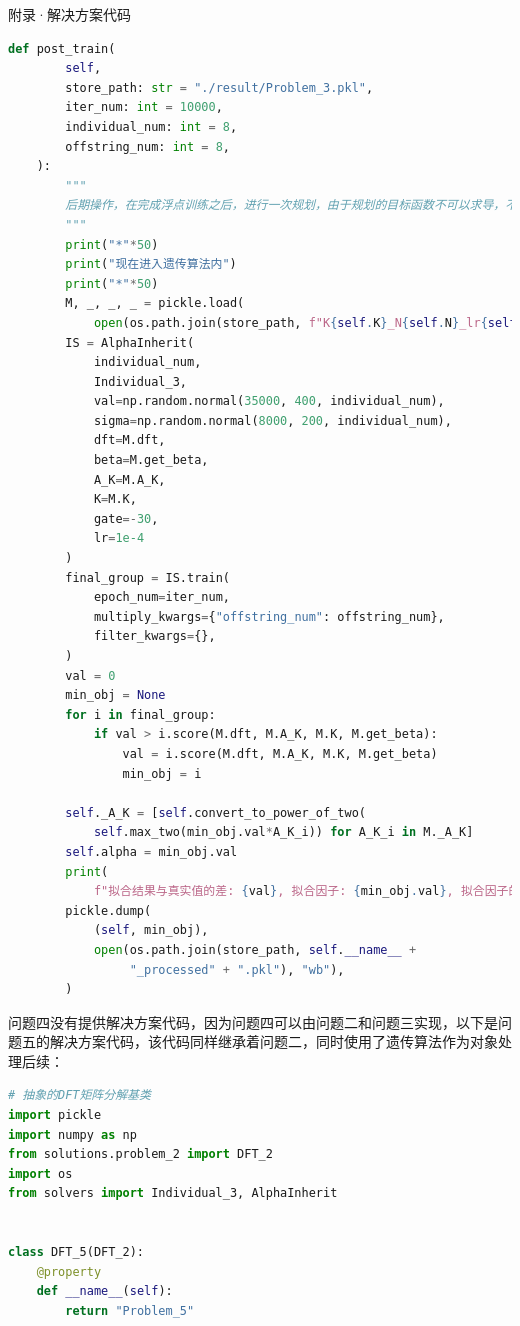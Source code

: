 \documentclass[11pt]{article}
\begin{document}
\begin{section}{附录·解决方案代码}
\begin{lstlisting}[language=Python]
    def post_train(
        self,
        store_path: str = "./result/Problem_3.pkl",
        iter_num: int = 10000,
        individual_num: int = 8,
        offstring_num: int = 8,
    ):
        """
        后期操作，在完成浮点训练之后，进行一次规划，由于规划的目标函数不可以求导，不能使用梯度下降，替代梯度的方法也不好做，这里尝试使用智能优化算法遗传算法来做。
        """
        print("*"*50)
        print("现在进入遗传算法内")
        print("*"*50)
        M, _, _, _ = pickle.load(
            open(os.path.join(store_path, f"K{self.K}_N{self.N}_lr{self.lr}_"+self.__name__+".pkl"), "rb"))
        IS = AlphaInherit(
            individual_num,
            Individual_3,
            val=np.random.normal(35000, 400, individual_num),
            sigma=np.random.normal(8000, 200, individual_num),
            dft=M.dft,
            beta=M.get_beta,
            A_K=M.A_K,
            K=M.K,
            gate=-30,
            lr=1e-4
        )
        final_group = IS.train(
            epoch_num=iter_num,
            multiply_kwargs={"offstring_num": offstring_num},
            filter_kwargs={},
        )
        val = 0
        min_obj = None
        for i in final_group:
            if val > i.score(M.dft, M.A_K, M.K, M.get_beta):
                val = i.score(M.dft, M.A_K, M.K, M.get_beta)
                min_obj = i

        self._A_K = [self.convert_to_power_of_two(
            self.max_two(min_obj.val*A_K_i)) for A_K_i in M._A_K]
        self.alpha = min_obj.val
        print(
            f"拟合结果与真实值的差: {val}, 拟合因子: {min_obj.val}, 拟合因子的标准差: {min_obj.sigma}")
        pickle.dump(
            (self, min_obj),
            open(os.path.join(store_path, self.__name__ +
                 "_processed" + ".pkl"), "wb"),
        )

 \end{lstlisting}
 问题四没有提供解决方案代码，因为问题四可以由问题二和问题三实现，以下是问题五的解决方案代码，该代码同样继承着问题二，同时使用了遗传算法作为对象处理后续：
 \begin{lstlisting}[language=Python]
  # 抽象的DFT矩阵分解基类
import pickle
import numpy as np
from solutions.problem_2 import DFT_2
import os
from solvers import Individual_3, AlphaInherit


class DFT_5(DFT_2):
    @property
    def __name__(self):
        return "Problem_5"


\end{lstlisting}
\end{section}
\end{document}
